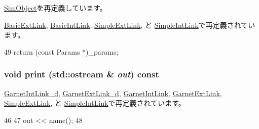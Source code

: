\hyperlink{classSimObject_acd3c3feb78ae7a8f88fe0f110a718dff}{SimObject}を再定義しています。

\hyperlink{classBasicExtLink_acd3c3feb78ae7a8f88fe0f110a718dff}{BasicExtLink}, \hyperlink{classBasicIntLink_acd3c3feb78ae7a8f88fe0f110a718dff}{BasicIntLink}, \hyperlink{classSimpleExtLink_acd3c3feb78ae7a8f88fe0f110a718dff}{SimpleExtLink}, と \hyperlink{classSimpleIntLink_acd3c3feb78ae7a8f88fe0f110a718dff}{SimpleIntLink}で再定義されています。


\begin{DoxyCode}
49 { return (const Params *)_params; }
\end{DoxyCode}
\hypertarget{classBasicLink_ac55fe386a101fbae38c716067c9966a0}{
\subsubsection[{print}]{\setlength{\rightskip}{0pt plus 5cm}void print (std::ostream \& {\em out}) const}}
\label{classBasicLink_ac55fe386a101fbae38c716067c9966a0}


\hyperlink{classGarnetIntLink__d_ac55fe386a101fbae38c716067c9966a0}{GarnetIntLink\_\-d}, \hyperlink{classGarnetExtLink__d_ac55fe386a101fbae38c716067c9966a0}{GarnetExtLink\_\-d}, \hyperlink{classGarnetIntLink_ac55fe386a101fbae38c716067c9966a0}{GarnetIntLink}, \hyperlink{classGarnetExtLink_ac55fe386a101fbae38c716067c9966a0}{GarnetExtLink}, \hyperlink{classSimpleExtLink_ac55fe386a101fbae38c716067c9966a0}{SimpleExtLink}, と \hyperlink{classSimpleIntLink_ac55fe386a101fbae38c716067c9966a0}{SimpleIntLink}で再定義されています。


\begin{DoxyCode}
46 {
47     out << name();
48 }
\end{DoxyCode}


